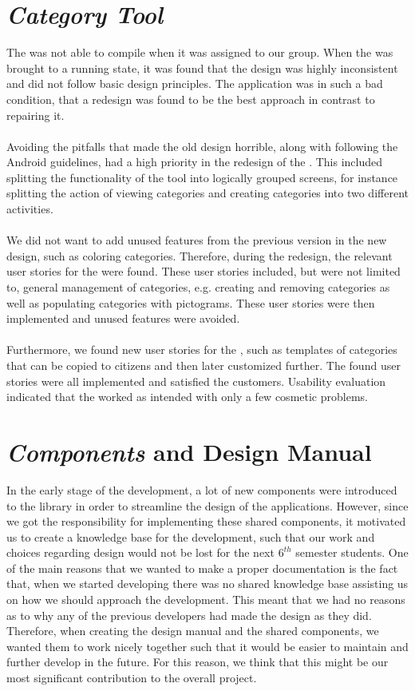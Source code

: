 \section*{\emph{Category Tool}}
The \ct was not able to compile when it was assigned to our group. When the \ct was brought to a running state, it was found that the design was highly inconsistent and did not follow basic design principles. The application was in such a bad condition, that a redesign was found to be the best approach in contrast to repairing it.
\\\\
Avoiding the pitfalls that made the old design horrible, along with following the Android guidelines, had a high priority in the redesign of the \ct. This included splitting the functionality of the tool into logically grouped screens, for instance splitting the action of viewing categories and creating categories into two different activities.
\\\\
We did not want to add unused features from the previous version in the new design, such as coloring categories. Therefore, during the redesign, the relevant user stories for the \ct were found. These user stories included, but were not limited to, general management of categories, e.g. creating and removing categories as well as populating categories with pictograms. These user stories were then implemented and unused features were avoided. 
\\\\
Furthermore, we found new user stories for the \ct, such as templates of categories that can be copied to citizens and then later customized further. The found user stories were all implemented and satisfied the customers. Usability evaluation indicated that the \ct worked as intended with only a few cosmetic problems.

\section*{\giraf \emph{Components} and Design Manual}
In the early stage of the development, a lot of new components were introduced to the \gc library in order to streamline the design of the \giraf applications. However, since we got the responsibility for implementing these shared components, it motivated us to create a knowledge base for the development, such that our work and choices regarding design would not be lost for the next $6^{th}$ semester students. One of the main reasons that we wanted to make a proper documentation is the fact that, when we started developing there was no shared knowledge base assisting us on how we should approach the development. This meant that we had no reasons as to why any of the previous \giraf developers had made the design as they did. Therefore, when creating the design manual and the shared components, we wanted them to work nicely together such that it would be easier to maintain and further develop in the future. For this reason, we think that this might be our most significant contribution to the overall project.